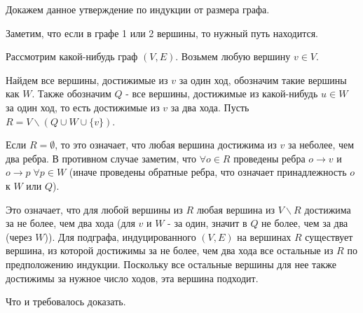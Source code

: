 \documentclass[12pt]{article}
\begin{document}
	Докажем данное утверждение по индукции от размера графа.
	
	Заметим, что если в графе 1 или 2 вершины, то нужный путь находится.
	
	Рассмотрим какой-нибудь граф $(V, E)$. Возьмем любую вершину $v \in V$.
	
	Найдем все вершины, достижимые из $v$ за один ход,
	обозначим такие вершины как $W$. Также обозначим $Q$ - все вершины,
	достижимые из какой-нибудь $u \in W$ за один ход, то есть достижимые из 
	$v$ за два хода. Пусть $R = V \backslash (Q \cup W \cup \{v\})$.
	
	Если $R = \emptyset$, то это означает, что любая вершина достижима из $v$
	за неболее, чем два ребра. В противном случае заметим, что 
	$\forall o \in R$ проведены ребра $o \rightarrow v$ и 
	$o \rightarrow p \; \forall p \in W$ (иначе проведены обратные ребра,
	что означает принадлежность $o$ к $W$ или $Q$).
	
	Это означает, что для любой вершины из $R$ любая вершина из 
	$V \backslash R$ достижима за не более, чем два хода 
	(для $v$ и $W$ - за один, значит в $Q$ не более, чем за два (через $W$)).
	Для подграфа, индуцированного $(V, E)$ на вершинах $R$ существует вершина,
	из которой достижимы за не более, чем два хода все остальные из $R$ по 
	предположению индукции. Поскольку все остальные вершины для нее 
	также достижимы за нужное число ходов, эта вершина подходит. 
	
	Что и требовалось доказать.	 
	 
\end{document}
